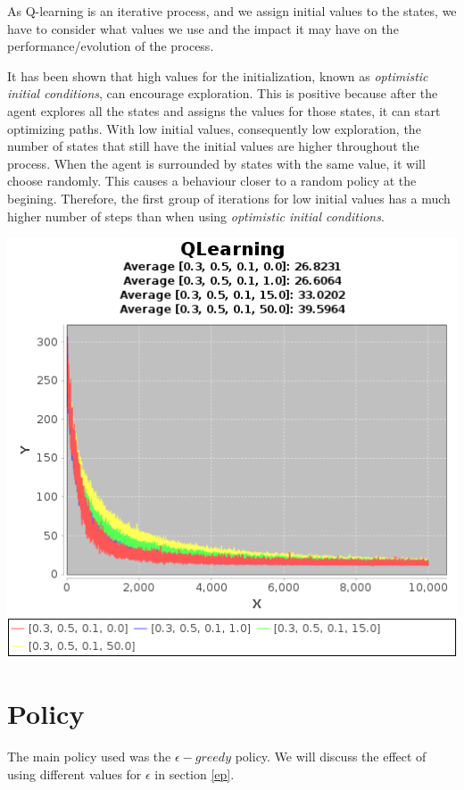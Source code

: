 \documentclass{article}
\begin{document}
As Q-learning is an iterative process, and we assign initial values to the
states, we have to consider what values we use and the impact it may have on the
performance/evolution of the process.

It has been shown that high values for the initialization, known as \emph{optimistic
initial conditions}, can encourage exploration. This is positive because after
the agent explores all the states and assigns the values for those states, it can
start optimizing paths.
With low initial values, consequently low exploration, the number of states that
still have the initial values are higher throughout the process. When the agent
is surrounded by states with the same value, it will choose randomly. This causes a
behaviour closer to a random policy at the begining. Therefore, the first group of
iterations for low initial values has a much higher number of steps than when using \emph{optimistic
initial conditions}.

\includegraphics[]{res/alpha_03_gama_05_epsilon_01IV_00_to_50.png}

\section{Policy}
The main policy used was the $\epsilon-greedy$ policy. We will discuss the effect of using different values for $\epsilon$ in section \ref{ep}.
\end{document}

